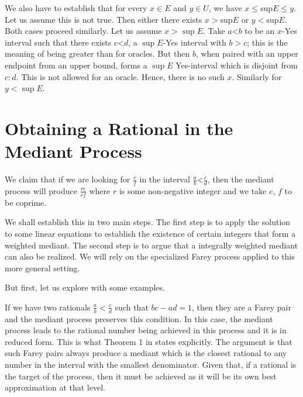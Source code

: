 \documentclass[12pt]{article}
\theoremstyle{remark}
\newcommand{\lt}{\mathord{<}}
\begin{document}
We also have to establish that for every $x \in E$ and $y \in U$, we have $x \leq \mathrm{sup} E \leq y$. Let us assume this is not true. Then either there exists $x > \mathrm{sup} E$ or $y < \mathrm{sup} E$. Both cases proceed similarly. Let us 
assume $ x > \sup E$. Take $a \lt b$ to be an $x$-Yes interval such that there exists $c \lt d$, a $\sup E$-Yes interval with $b > c$; this is the meaning of being greater than for oracles. But then $b$, when paired with an upper endpoint from an upper bound, forms a $\sup E$ Yes-interval which is disjoint from $c:d$. This is not allowed for an oracle. Hence, there is no such $x$. Similarly for $y < \sup E$. 

\section{Obtaining a Rational in the Mediant Process}\label{app:med}

We claim that if we are looking for $\frac{e}{f}$ in the interval $\frac{a}{b} \lt \frac{c}{d}$, then the mediant process will produce $\frac{re}{rf}$ where $r$ is some non-negative integer and we take $e$, $f$ to be coprime. 

We shall establish this in two main steps. The first step is to apply the solution to some linear equations to establish the existence of certain integers that form a weighted mediant. The second step is to argue that a integrally weighted mediant can also be realized.  We will rely on the specialized Farey process applied to this more general setting. 

But first, let us explore with some examples. 

If we have two rationals $\frac{a}{b} < \frac{c}{d}$ such that $bc - ad = 1$, then they are a Farey pair and the mediant process preserves this condition. In this case, the mediant process leads to the rational number being achieved in this process and it is in reduced form. This is what Theorem 1 in \cite{richards} states explicitly. The argument is that such Farey pairs always produce a mediant which is the closest rational to any number in the interval with the smallest denominator. Given that, if a rational is the target of the process, then it must be achieved as it will be its own best approximation at that level. 
\end{document}
